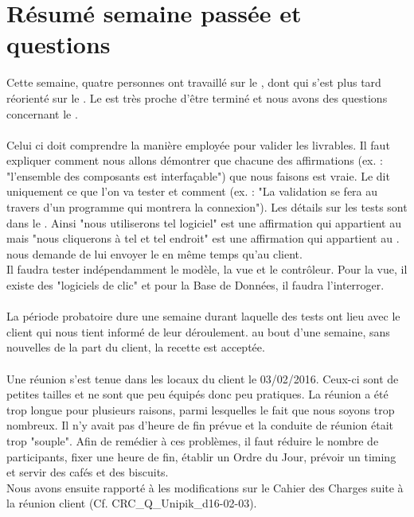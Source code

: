 \documentclass [a4paper] {article}
\begin{document}
\section{Résumé semaine passée et questions}
Cette semaine, quatre personnes ont travaillé sur le \DSE{}, dont \Michel{} qui s'est plus tard réorienté sur le \PTV{}. Le \DSECourt{} est très proche d'être terminé et nous avons des questions concernant le \PTVCourt{}.
\paragraph{}
Celui ci doit comprendre la manière employée pour valider les livrables. Il faut expliquer comment nous allons démontrer que chacune des affirmations (ex. : "l'ensemble des composants est interfaçable") que nous faisons est vraie. Le \PTVCourt{} dit uniquement ce que l'on va tester et comment (ex. : "La validation se fera au travers d'un programme qui montrera la connexion"). Les détails sur les tests sont dans le \CDR{}. Ainsi "nous utiliserons tel logiciel" est une affirmation qui appartient au \PTVCourt{} mais "nous cliquerons à tel et tel endroit" est une affirmation qui appartient au \CDR{}. \nomTuteurPedago{} nous demande de lui envoyer le \PTV{} en même temps qu'au client.
\\
Il faudra tester indépendamment le modèle, la vue et le contrôleur. Pour la vue, il existe des "logiciels de clic" et pour la Base de Données, il faudra l'interroger.
\paragraph{}
La période probatoire dure une semaine durant laquelle des tests ont lieu avec le client qui nous tient informé de leur déroulement. au bout d'une semaine, sans nouvelles de la part du client, la recette est acceptée.
\paragraph{}
Une réunion s'est tenue dans les locaux du client le 03/02/2016. Ceux-ci sont de petites tailles et ne sont que peu équipés donc peu pratiques. La réunion a été trop longue pour plusieurs raisons, parmi lesquelles le fait que nous soyons trop nombreux. Il n'y avait pas d'heure de fin prévue et la conduite de réunion était trop "souple". Afin de remédier à ces problèmes, il faut réduire le nombre de participants, fixer une heure de fin, établir un Ordre du Jour, prévoir un timing et servir des cafés et des biscuits.
\\
Nous avons ensuite rapporté à \nomTuteurPedago{} les modifications sur le Cahier des Charges suite à la réunion client (Cf. CRC\_Q\_Unipik\_d16-02-03).
\end{document}
